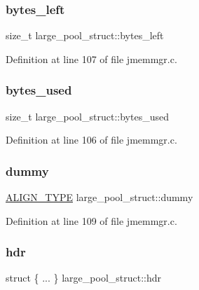 \subsubsection{\texorpdfstring{bytes\_left}{bytes\_left}}
{\footnotesize\ttfamily size\+\_\+t large\+\_\+pool\+\_\+struct\+::bytes\+\_\+left}



Definition at line 107 of file jmemmgr.\+c.

\mbox{\label{unionlarge__pool__struct_a6a809a92d1775c242eba37daabaa4b3b}} 
\subsubsection{\texorpdfstring{bytes\_used}{bytes\_used}}
{\footnotesize\ttfamily size\+\_\+t large\+\_\+pool\+\_\+struct\+::bytes\+\_\+used}



Definition at line 106 of file jmemmgr.\+c.

\mbox{\label{unionlarge__pool__struct_a850fcb897c7fbfb12dd01193fa0c48aa}} 
\subsubsection{\texorpdfstring{dummy}{dummy}}
{\footnotesize\ttfamily \mbox{\hyperlink{jmemmgr_8c_a4781c052bb138f69ef6d60737fd569e3}{A\+L\+I\+G\+N\+\_\+\+T\+Y\+PE}} large\+\_\+pool\+\_\+struct\+::dummy}



Definition at line 109 of file jmemmgr.\+c.

\mbox{\label{unionlarge__pool__struct_a92556ba164f9d34c437bd80207c2a29f}} 
\subsubsection{\texorpdfstring{hdr}{hdr}}
{\footnotesize\ttfamily struct \{ ... \}   large\+\_\+pool\+\_\+struct\+::hdr}

